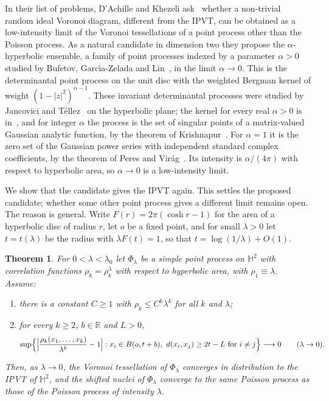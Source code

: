\documentclass[11pt]{amsart}
\newtheorem{theorem}{Theorem}[section]
\theoremstyle{definition}
\theoremstyle{remark}
\newcommand{\HH}{\mathbb{H}}
\newcommand{\R}{\mathbb{R}}
\begin{document}
In their list of problems, D'Achille and Khezeli ask~\cite[Question~7.2]{DK26} whether a non-trivial random ideal
Voronoi diagram, different from the IPVT, can be obtained as a low-intensity limit of the Voronoi tessellations of a
point process other than the Poisson process. As a natural candidate in dimension two they propose the
$\alpha$-hyperbolic ensemble, a family of point processes indexed by a parameter $\alpha>0$ studied by Bufetov,
Garc\'{\i}a-Zelada and Lin~\cite{BGZL23}, in the limit $\alpha\to0$. This is the determinantal point process on the
unit disc with the weighted Bergman kernel of weight $(1-|z|^2)^{\alpha-1}$. These invariant determinantal processes
were studied by Jancovici and T\'ellez~\cite{JT98} on the hyperbolic plane; the kernel for every real $\alpha>0$ is
in~\cite[Section~4.3.11]{HKPV09}, and for integer $\alpha$ the process is the set of singular points of a
matrix-valued Gaussian analytic function, by the theorem of Krishnapur~\cite{Kri09}. For $\alpha=1$ it is the zero
set of the Gaussian power series with independent standard complex coefficients, by the theorem of Peres and
Vir\'ag~\cite{PV05}. Its intensity is $\alpha/(4\pi)$ with respect to hyperbolic area, so $\alpha\to0$ is a
low-intensity limit.

We show that the candidate gives the IPVT again. This settles the proposed candidate; whether some other point process
gives a different limit remains open. The reason is general. Write $F(r)=2\pi(\cosh r-1)$ for the area of
a hyperbolic disc of radius $r$, let $o$ be a fixed point, and for small $\lambda>0$ let $t=t(\lambda)$ be the radius
with $\lambda F(t)=1$, so that $t=\log(1/\lambda)+O(1)$.

\begin{theorem}\label{thm:main}
For $0<\lambda<\lambda_0$ let $\Phi_\lambda$ be a simple point process on $\HH^2$ with correlation functions
$\rho_k=\rho^\lambda_k$ with respect to hyperbolic area, with $\rho_1\equiv\lambda$. Assume:
\begin{enumerate}
\item[(A)] there is a constant $C\ge1$ with $\rho_k\le C^k\lambda^k$ for all $k$ and $\lambda$;
\item[(B)] for every $k\ge2$, $b\in\R$ and $L>0$,
\[
  \sup\Bigl\{\Bigl|\frac{\rho_k(x_1,\dots,x_k)}{\lambda^k}-1\Bigr| : x_i\in B(o,t+b),\ d(x_i,x_j)\ge 2t-L
  \text{ for }i\ne j\Bigr\}\longrightarrow0\qquad(\lambda\to0).
\]
\end{enumerate}
Then, as $\lambda\to0$, the Voronoi tessellation of $\Phi_\lambda$ converges in distribution to the IPVT of $\HH^2$, and
the shifted nuclei of $\Phi_\lambda$ converge to the same Poisson process as those of the Poisson process of intensity
$\lambda$.
\end{theorem}
\end{document}
